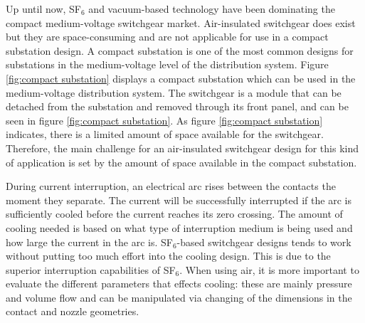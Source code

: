 \documentclass[10pt,a4paper,twoside]{article}
\begin{document}
Up until now, SF$_6$ and vacuum-based technology have been dominating the compact medium-voltage switchgear market. Air-insulated switchgear does exist but they are space-consuming and are not applicable for use in a compact substation design. A compact substation is one of the most common designs for substations in the medium-voltage level of the distribution system. Figure \ref{fig:compact substation} displays a compact substation which can be used in the medium-voltage distribution system. The switchgear is a module that can be detached from the substation and removed through its front panel, and can be seen in figure \ref{fig:compact substation}. As figure \ref{fig:compact substation} indicates, there is a limited amount of space available for the switchgear. Therefore, the main challenge for an air-insulated switchgear design for this kind of application is set by the amount of space available in the compact substation.

During current interruption, an electrical arc rises between the contacts the moment they separate. The current will be successfully interrupted if the arc is sufficiently cooled before the current reaches its zero crossing. The amount of cooling needed is based on what type of interruption medium is being used and how large the current in the arc is. SF$_6$-based switchgear designs tends to work without putting too much effort into the cooling design. This is due to the superior interruption capabilities of SF$_6$. When using air, it is more important to evaluate the different parameters that effects cooling: these are mainly pressure and volume flow and can be manipulated via changing of the dimensions in the contact and nozzle geometries.
\end{document}
